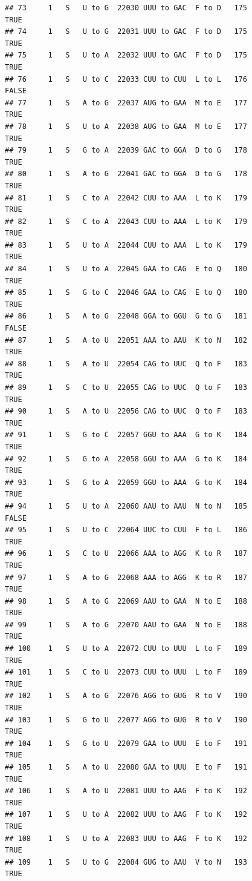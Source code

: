 \documentclass[
  12pt,
]{article}
\begin{document}
\begin{verbatim}
## 73     1   S   U to G  22030 UUU to GAC  F to D   175           TRUE
## 74     1   S   U to G  22031 UUU to GAC  F to D   175           TRUE
## 75     1   S   U to A  22032 UUU to GAC  F to D   175           TRUE
## 76     1   S   U to C  22033 CUU to CUU  L to L   176          FALSE
## 77     1   S   A to G  22037 AUG to GAA  M to E   177           TRUE
## 78     1   S   U to A  22038 AUG to GAA  M to E   177           TRUE
## 79     1   S   G to A  22039 GAC to GGA  D to G   178           TRUE
## 80     1   S   A to G  22041 GAC to GGA  D to G   178           TRUE
## 81     1   S   C to A  22042 CUU to AAA  L to K   179           TRUE
## 82     1   S   C to A  22043 CUU to AAA  L to K   179           TRUE
## 83     1   S   U to A  22044 CUU to AAA  L to K   179           TRUE
## 84     1   S   U to A  22045 GAA to CAG  E to Q   180           TRUE
## 85     1   S   G to C  22046 GAA to CAG  E to Q   180           TRUE
## 86     1   S   A to G  22048 GGA to GGU  G to G   181          FALSE
## 87     1   S   A to U  22051 AAA to AAU  K to N   182           TRUE
## 88     1   S   A to U  22054 CAG to UUC  Q to F   183           TRUE
## 89     1   S   C to U  22055 CAG to UUC  Q to F   183           TRUE
## 90     1   S   A to U  22056 CAG to UUC  Q to F   183           TRUE
## 91     1   S   G to C  22057 GGU to AAA  G to K   184           TRUE
## 92     1   S   G to A  22058 GGU to AAA  G to K   184           TRUE
## 93     1   S   G to A  22059 GGU to AAA  G to K   184           TRUE
## 94     1   S   U to A  22060 AAU to AAU  N to N   185          FALSE
## 95     1   S   U to C  22064 UUC to CUU  F to L   186           TRUE
## 96     1   S   C to U  22066 AAA to AGG  K to R   187           TRUE
## 97     1   S   A to G  22068 AAA to AGG  K to R   187           TRUE
## 98     1   S   A to G  22069 AAU to GAA  N to E   188           TRUE
## 99     1   S   A to G  22070 AAU to GAA  N to E   188           TRUE
## 100    1   S   U to A  22072 CUU to UUU  L to F   189           TRUE
## 101    1   S   C to U  22073 CUU to UUU  L to F   189           TRUE
## 102    1   S   A to G  22076 AGG to GUG  R to V   190           TRUE
## 103    1   S   G to U  22077 AGG to GUG  R to V   190           TRUE
## 104    1   S   G to U  22079 GAA to UUU  E to F   191           TRUE
## 105    1   S   A to U  22080 GAA to UUU  E to F   191           TRUE
## 106    1   S   A to U  22081 UUU to AAG  F to K   192           TRUE
## 107    1   S   U to A  22082 UUU to AAG  F to K   192           TRUE
## 108    1   S   U to A  22083 UUU to AAG  F to K   192           TRUE
## 109    1   S   U to G  22084 GUG to AAU  V to N   193           TRUE

\end{verbatim}
\end{document}
